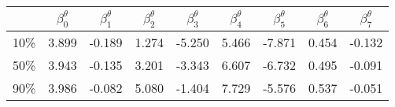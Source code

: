 \begin{tabular}{ccccccccc}
\hline
 & $\beta_0^{\theta}$ & $\beta_1^{\theta}$ & $\beta_2^{\theta}$ & $\beta_3^{\theta}$ & $\beta_4^{\theta}$ & $\beta_5^{\theta}$ & $\beta_6^{\theta}$ & $\beta_7^{\theta}$ \\
\hline
10\% &  3.899 & -0.189 & 1.274 &  -5.250 & 5.466 &-7.871&0.454& -0.132 \\
50\% & 3.943 & -0.135 & 3.201 & -3.343 & 6.607 &-6.732&0.495& -0.091 \\
90\% &  3.986 & -0.082 & 5.080 & -1.404 & 7.729 &-5.576&0.537& -0.051\\
\hline
\end{tabular}